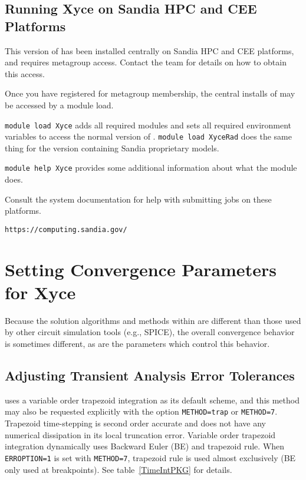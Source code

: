 \section{Running Xyce on Sandia HPC and CEE Platforms}



This version of \Xyce{} has been installed centrally on Sandia HPC
and CEE platforms, and requires metagroup access.  Contact the \Xyce{} team
for details on how to obtain this access.

Once you have registered for metagroup membership, the central
installs of \Xyce{} may be accessed by a module load.

\verb+module load Xyce+ adds all required modules and sets all
required environment variables to access the normal version of
\Xyce{}.  \verb+module load XyceRad+ does the same thing for the
version \Xyce{} containing Sandia proprietary models.

\verb+module help Xyce+ provides some additional information about
what the module does.

Consult the system documentation for help with submitting jobs on
these platforms.

\verb+https://computing.sandia.gov/+

\chapter{Setting Convergence Parameters for Xyce}
\label{Conv_Guidelines}

Because the solution algorithms and methods within \Xyce{} are different than
those used by other circuit simulation tools (e.g., SPICE), the overall
convergence behavior is sometimes different, as are the parameters which control
this behavior.

\section{Adjusting Transient Analysis Error Tolerances}

\Xyce{} uses a variable order trapezoid integration as its default
scheme, and this method may also be requested explicitly with the
 option \texttt{METHOD=trap} or
\texttt{METHOD=7}. Trapezoid time-stepping is second order accurate
and does not have any numerical dissipation in its local truncation
error. Variable order trapezoid integration dynamically uses Backward
Euler (BE) and trapezoid rule. When \texttt{ERROPTION=1} is set with
\texttt{METHOD=7}, trapezoid rule is used almost exclusively (BE
only used at breakpoints). See table~\ref{TimeIntPKG} for details.


